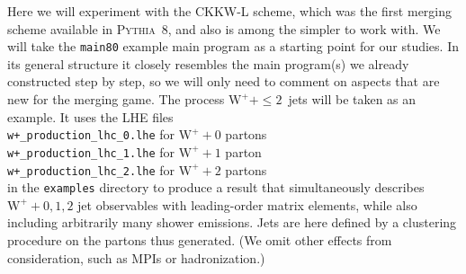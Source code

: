 \documentclass[12pt,a4paper]{article}
\newcommand{\W}{{\mathrm W}}
\begin{document}
Here we will experiment with the {\smaller CKKW-L} scheme, which was 
the first merging scheme available in \textsc{Pythia}~8, and also
is among the simpler to work with. We will take the \texttt{main80}
example main program as a starting point for our studies. In its
general structure it closely resembles the main program(s) we already
constructed step by step, so we will only need to comment on aspects
that are new for the merging game. The process $\W^+ + \leq 2$~jets 
will be taken as an example. It uses the LHE files\\
\hspace*{10mm}\texttt{w+\_production\_lhc\_0.lhe} for $\W^+ + 0$ partons\\
\hspace*{10mm}\texttt{w+\_production\_lhc\_1.lhe} for $\W^+ + 1$ parton\\
\hspace*{10mm}\texttt{w+\_production\_lhc\_2.lhe} for $\W^+ + 2$ partons\\
in the \texttt{examples} directory to produce a result that simultaneously 
describes $\W^+ + 0,1,2$ jet observables with leading-order matrix 
elements, while also including arbitrarily many shower emissions.
Jets are here defined by a clustering procedure on the partons thus 
generated. (We omit other effects from consideration, such as MPIs or 
hadronization.)  
\end{document}
